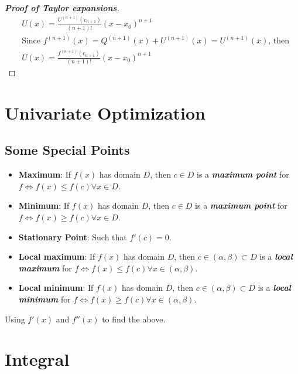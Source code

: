 \begin{proof}[\textbf{Proof of Taylor expansions}]
\begin{align*}
         & U(x) = \frac{U^{(n+1)}(c_{n+1})}{(n+1)!}(x-x_0)^{n+1}                                                                                                                                                         \\
         & \text{Since $f^{(n+1)}(x) = Q^{(n+1)}(x) + U^{(n+1)}(x) = U^{(n+1)}(x)$, then}                                                                                                                                \\
         & U(x) = \frac{f^{(n+1)}(c_{n+1})}{(n+1)!}(x-x_0)^{n+1}
    \end{align*}
\end{proof}



\section{Univariate Optimization}

\subsection{Some Special Points}

\begin{itemize}
    \item \textbf{Maximum}: If $f(x)$ has domain $D$, then $c \in D$ is a \textit{\textbf{maximum point}} for $f \iff f(x) \leq f(c) \forall x \in D$.
    \item \textbf{Minimum}: If $f(x)$ has domain $D$, then $c \in D$ is a \textit{\textbf{maximum point}} for $f \iff f(x) \geq f(c) \forall x \in D$.
    \item \textbf{Stationary Point}: Such that $f'(c) = 0$.
    \item \textbf{Local maximum}: If $f(x)$ has domain $D$, then $c \in (\alpha, \beta) \subset D$ is a \textit{\textbf{local maximum}} for $f \iff f(x) \leq f(c) \forall x \in (\alpha, \beta)$.
    \item \textbf{Local minimum}: If $f(x)$ has domain $D$, then $c \in (\alpha, \beta) \subset D$ is a \textit{\textbf{local minimum}} for $f \iff f(x) \geq f(c) \forall x \in (\alpha, \beta)$.
\end{itemize}

\begin{remark*}
    Using $f'(x)$ and $f''(x)$ to find the above.
\end{remark*}

\section{Integral}

